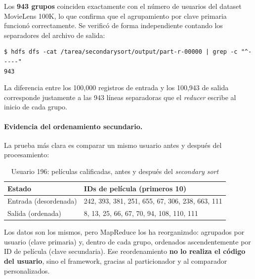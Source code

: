Los \textbf{943 grupos} coinciden exactamente con el número de usuarios del dataset MovieLens 100K, lo que confirma que el agrupamiento por clave primaria funcionó correctamente. Se verificó de forma independiente contando los separadores del archivo de salida:

\begin{lstlisting}[style=sh]
$ hdfs dfs -cat /tarea/secondarysort/output/part-r-00000 | grep -c "^-----"
943
\end{lstlisting}

La diferencia entre los 100,000 registros de entrada y los 100,943 de salida corresponde justamente a las 943 líneas separadoras que el \textit{reducer} escribe al inicio de cada grupo.


\paragraph{Evidencia del ordenamiento secundario.} La prueba más clara es comparar un mismo usuario antes y después del procesamiento:

\begin{table}[H]
\centering
\caption{Usuario 196: películas calificadas, antes y después del \textit{secondary sort}}
\label{tab:usuario196}
\vspace{0.2cm}
\small
\begin{tabular}{@{}lp{9cm}@{}}
\toprule
\textbf{Estado} & \textbf{IDs de película (primeros 10)} \\
\midrule
Entrada (desordenada) & 242, 393, 381, 251, 655, 67, 306, 238, 663, 111 \\
Salida (ordenada)     & 8, 13, 25, 66, 67, 70, 94, 108, 110, 111 \\
\bottomrule
\end{tabular}
\end{table}

Los datos son los mismos, pero MapReduce los ha reorganizado: agrupados por usuario (clave primaria) y, dentro de cada grupo, ordenados ascendentemente por ID de película (clave secundaria). Ese reordenamiento \textbf{no lo realiza el código del usuario}, sino el framework, gracias al particionador y al comparador personalizados.


